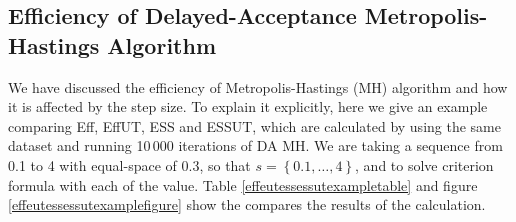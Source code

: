 \subsection{Efficiency of Delayed-Acceptance Metropolis-Hastings Algorithm}

We have discussed the efficiency of Metropolis-Hastings (MH) algorithm and how it is affected by the step size. To explain it explicitly, here we give an example comparing Eff, EffUT, ESS and ESSUT, which are calculated by using the same dataset and running 10\,000 iterations of DA MH. We are taking a sequence from 0.1 to 4 with equal-space of 0.3, so that $s=\left\lbrace 0.1,\dots,4\right\rbrace$, and to solve criterion formula with each of the value. Table \ref{effeutessessutexampletable} and figure \ref{effeutessessutexamplefigure} show the compares the results of the calculation. 

